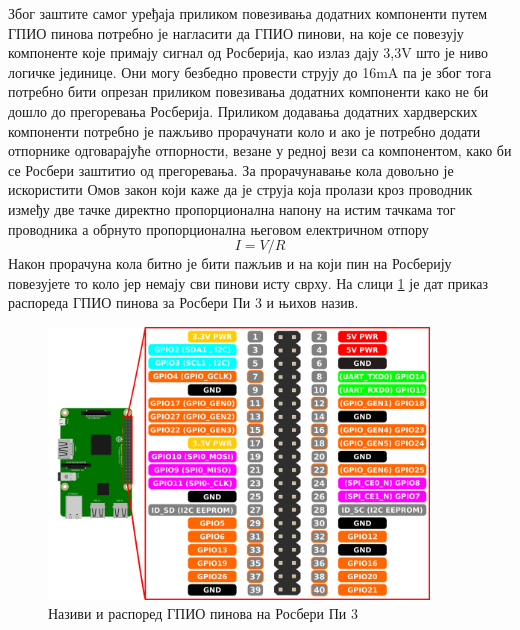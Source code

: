 \documentclass[12pt,oneside]{memoir}
\theoremstyle{remark}
\begin{document}
Због заштите самог уређаја приликом повезивања додатних компоненти путем ГПИО пинова потребно је нагласити да ГПИО пинови, на које се повезују компоненте које примају сигнал од Росберија, као излаз дају 3,3V што је ниво логичке јединице. Они могу безбедно провести струју до 16mA па је због тога потребно бити опрезан приликом повезивања додатних компоненти како не би дошло до прегоревања Росберија. Приликом додавања додатних хардверских компоненти потребно је пажљиво прорачунати коло и ако је потребно додати отпорнике одговарајуће отпорности, везане у редној вези са компонентом, како би се Росбери заштитио од прегоревања. За прорачунавање кола довољно је искористити Омов закон који каже да је струја која пролази кроз проводник између две тачке директно пропорционална напону на истим тачкама тог про\-водника а обрнуто пропорционална његовом електричном отпору $$ I = V/R $$ Након прорачуна кола битно је бити пажљив и на који пин на Росберију повезујете то коло јер немају сви пинови исту сврху. На слици \ref{fig:rpigpioimg} је дат приказ распореда ГПИО пинова за Росбери Пи 3 и њихов назив. 

\begin{figure}[!ht]
\centering
\includegraphics[width=0.9\textwidth]{slike/rpigpio.png}
\caption{Називи и распоред ГПИО пинова на Росбери Пи 3}
\label{fig:rpigpioimg}
\end{figure}
\end{document}
